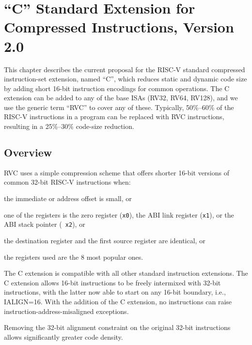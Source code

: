 \chapter{``C'' Standard Extension for Compressed Instructions, Version
2.0}
\label{compressed}

This chapter describes the current proposal for the RISC-V
standard compressed instruction-set extension, named ``C'', which
reduces static and dynamic code size by adding short 16-bit
instruction encodings for common operations.  The C extension can be
added to any of the base ISAs (RV32, RV64, RV128), and we use the
generic term ``RVC'' to cover any of these.  Typically, 50\%--60\% of
the RISC-V instructions in a program can be replaced with RVC
instructions, resulting in a 25\%--30\% code-size reduction.

\section{Overview}

RVC uses a simple compression scheme that offers shorter 16-bit
versions of common 32-bit RISC-V instructions when:
\begin{tightlist}
	\item the immediate or address offset is small, or
	\item one of the registers is the zero register ({\tt x0}), the
      ABI link register ({\tt x1}), or the ABI stack pointer ({\tt
        x2}), or
	\item the destination register and the first source register are
      identical, or   
	\item the registers used are the 8 most popular ones. 
\end{tightlist}

The C extension is compatible with all other standard instruction
extensions.  The C extension allows 16-bit instructions to be freely
intermixed with 32-bit instructions, with the latter now able to start
on any 16-bit boundary, i.e., IALIGN=16.  With the addition of the C
extension, no instructions can raise instruction-address-misaligned
exceptions.

\pagebreak

\begin{commentary}
Removing the 32-bit alignment constraint on the original 32-bit
instructions allows significantly greater code density.
\end{commentary}


